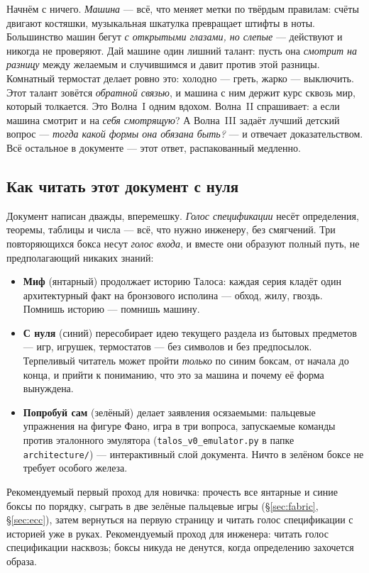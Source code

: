 \begin{zerobox}
Начнём с ничего. \emph{Машина} --- всё, что меняет метки по твёрдым
правилам: счёты двигают костяшки, музыкальная шкатулка превращает штифты в
ноты. Большинство машин бегут \emph{с открытыми глазами, но слепые} ---
действуют и никогда не проверяют. Дай машине один лишний талант: пусть она
\emph{смотрит на разницу} между желаемым и случившимся и давит против этой
разницы. Комнатный термостат делает ровно это: холодно --- греть, жарко ---
выключить. Этот талант зовётся \emph{обратной связью}, и машина с ним держит
курс сквозь мир, который толкается. Это Волна~I одним вдохом. Волна~II
спрашивает: а если машина смотрит и на \emph{себя смотрящую}? А Волна~III
задаёт лучший детский вопрос --- \emph{тогда какой формы она обязана быть?}
--- и отвечает доказательством. Всё остальное в документе --- этот ответ,
распакованный медленно.
\end{zerobox}

\subsection{Как читать этот документ с нуля}
\label{subsec:howtoread}

Документ написан дважды, вперемешку. \emph{Голос спецификации} несёт
определения, теоремы, таблицы и числа --- всё, что нужно инженеру, без
смягчений. Три повторяющихся бокса несут \emph{голос входа}, и вместе они
образуют полный путь, не предполагающий никаких знаний:

\begin{itemize}[leftmargin=1.5em,itemsep=1pt]
  \item \textbf{\textcolor{talosamber!85!black}{Миф}} (янтарный) продолжает
        историю Талоса: каждая серия кладёт один архитектурный факт на
        бронзового исполина --- обход, жилу, гвоздь. Помнишь историю ---
        помнишь машину.
  \item \textbf{\textcolor{plosblue!70!black}{С нуля}} (синий) пересобирает
        идею текущего раздела из бытовых предметов --- игр, игрушек,
        термостатов --- без символов и без предпосылок. Терпеливый читатель
        может пройти \emph{только} по синим боксам, от начала до конца, и
        прийти к пониманию, что это за машина и почему её форма вынуждена.
  \item \textbf{\textcolor{green!45!black}{Попробуй сам}} (зелёный) делает
        заявления осязаемыми: пальцевые упражнения на фигуре Фано, игра в
        три вопроса, запускаемые команды против эталонного эмулятора
        (\texttt{talos\_v0\_emulator.py} в папке \texttt{architecture/}) ---
        интерактивный слой документа. Ничто в зелёном боксе не требует
        особого железа.
\end{itemize}

Рекомендуемый первый проход для новичка: прочесть все янтарные и синие боксы
по порядку, сыграть в две зелёные пальцевые игры (\S\ref{sec:fabric},
\S\ref{sec:ecc}), затем вернуться на первую страницу и читать голос
спецификации с историей уже в руках. Рекомендуемый проход для инженера:
читать голос спецификации насквозь; боксы никуда не денутся, когда
определению захочется образа.
